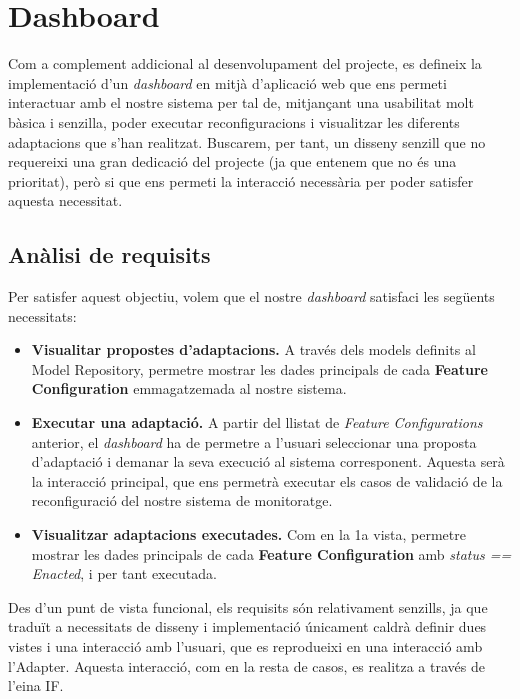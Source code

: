 
\chapter{Dashboard} %

\label{DissenyDashboard} %

Com a complement addicional al desenvolupament del projecte, es defineix la implementació d'un \textit{dashboard} en mitjà d'aplicació web que ens permeti interactuar amb el nostre sistema per tal de, mitjançant una usabilitat molt bàsica i senzilla, poder executar reconfiguracions i visualitzar les diferents adaptacions que s'han realitzat. Buscarem, per tant, un disseny senzill que no requereixi una gran dedicació del projecte (ja que entenem que no és una prioritat), però si que ens permeti la interacció necessària per poder satisfer aquesta necessitat.

\section{Anàlisi de requisits}

Per satisfer aquest objectiu, volem que el nostre \textit{dashboard} satisfaci les següents necessitats:

\begin{itemize}
\item \textbf{Visualitar propostes d'adaptacions.} A través dels models definits al Model Repository, permetre mostrar les dades principals de cada \textbf{Feature Configuration} emmagatzemada al nostre sistema.
\item \textbf{Executar una adaptació.} A partir del llistat de \textit{Feature Configurations} anterior, el \textit{dashboard} ha de permetre a l'usuari seleccionar una proposta d'adaptació i demanar la seva execució al sistema corresponent. Aquesta serà la interacció principal, que ens permetrà executar els casos de validació de la reconfiguració del nostre sistema de monitoratge. 
\item \textbf{Visualitzar adaptacions executades.} Com en la 1a vista, permetre mostrar les dades principals de cada \textbf{Feature Configuration} amb \textit{status == Enacted}, i per tant executada.
\end{itemize}

Des d'un punt de vista funcional, els requisits són relativament senzills, ja que traduït a necessitats de disseny i implementació únicament caldrà definir dues vistes i una interacció amb l'usuari, que es reprodueixi en una interacció amb l'Adapter. Aquesta interacció, com en la resta de casos, es realitza a través de l'eina IF.

